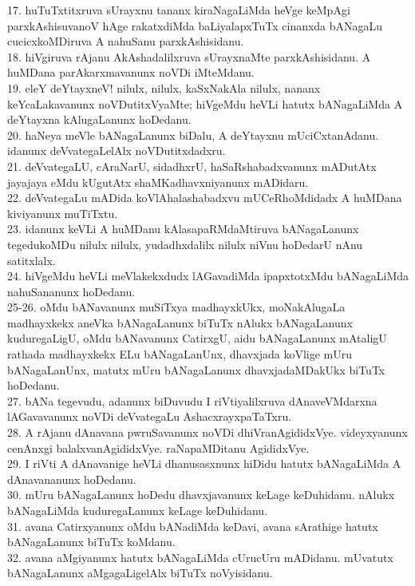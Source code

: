 \documentclass{article}
\begin{document}
17. huTuTxtitxruva sUrayxnu tananx kiraNagaLiMda heVge keMpAgi parxkAshisuvanoV hAge rakatxdiMda baLiyalapxTuTx cinanxda bANagaLu cucicxkoMDiruva A nahuSanu parxkAshisidanu.\\
18. hiVgiruva rAjanu AkAshadalilxruva sUrayxnaMte parxkAshisidanu. A huMDana parAkarxmavanunx noVDi iMteMdanu.\\
19. eleY deYtayxneV! nilulx, nilulx, kaSxNakAla nilulx, nananx keYcaLakavanunx noVDutitxVyaMte; hiVgeMdu heVLi hatutx bANagaLiMda A deYtayxna kAlugaLanunx hoDedanu.\\
20. haNeya meVle bANagaLanunx biDalu, A deYtayxnu mUciCxtanAdanu. idanunx deVvategaLelAlx noVDutitxdadxru.\\
21. deVvategaLU, cAraNarU, sidadhxrU, haSaRshabadxvanunx mADutAtx jayajaya eMdu kUgutAtx shaMKadhavxniyanunx mADidaru.\\
22. deVvategaLu mADida koVlAhalashabadxvu mUCeRhoMdidadx A huMDana kiviyanunx muTiTxtu.\\
23. idanunx keVLi A huMDanu kAlasapaRMdaMtiruva bANagaLanunx tegedukoMDu nilulx nilulx, yudadhxdalilx nilulx niVnu hoDedarU nAnu satitxlalx.\\
24. hiVgeMdu heVLi meVlakekxdudx lAGavadiMda ipapxtotxMdu bANagaLiMda nahuSananunx hoDedanu.\\
25-26. oMdu bANavanunx muSiTxya madhayxkUkx, moNakAlugaLa madhayxkekx aneVka bANagaLanunx biTuTx nAlukx bANagaLanunx kuduregaLigU, oMdu bANavanunx CatirxgU, aidu bANagaLanunx mAtaligU rathada madhayxkekx ELu bANagaLanUnx, dhavxjada koVlige mUru bANagaLanUnx, matutx mUru bANagaLanunx dhavxjadaMDakUkx biTuTx hoDedanu.\\
27. bANa tegevudu, adanunx biDuvudu I riVtiyalilxruva dAnaveVMdarxna lAGavavanunx noVDi deVvategaLu AshacxrayxpaTaTxru.\\
28. A rAjanu dAnavana pwruSavanunx noVDi dhiVranAgididxVye. videyxyanunx cenAnxgi balalxvanAgididxVye. raNapaMDitanu AgididxVye.\\
29. I riVti A dAnavanige heVLi dhanusasxnunx hiDidu hatutx bANagaLiMda A dAnavananunx hoDedanu.\\
30. mUru bANagaLanunx hoDedu dhavxjavanunx keLage keDuhidanu. nAlukx bANagaLiMda kuduregaLanunx keLage keDuhidanu.\\
31. avana Catirxyanunx oMdu bANadiMda keDavi, avana sArathige hatutx bANagaLanunx biTuTx koMdanu.\\
32. avana aMgiyanunx hatutx bANagaLiMda cUrucUru mADidanu. mUvatutx bANagaLanunx aMgagaLigelAlx biTuTx noVyisidanu.\\
\end{document}
